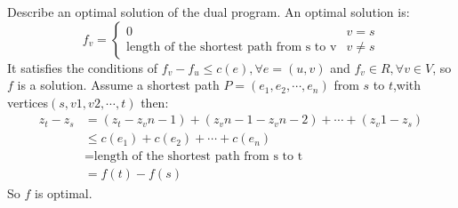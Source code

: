 \documentclass[11pt,a4paper,oneside]{article}
\begin{document}
\begin{problem}{5}
	\statement
  Describe an optimal solution of the dual program.
    \solution
	An optimal solution is:
	\begin{equation}
	f_v=
	\begin{cases}
	0& v=s\\
	\text{length of the shortest path from s to v}&v\neq s
	\end{cases}
	\end{equation}
	It satisfies the conditions of $f_v-f_u\leq c(e),\forall e=(u,v)$ and $f_v\in R,\forall v\in V$, so $f$ is a solution.
	Assume a shortest path $P=(e_1,e_2,\cdots,e_n)$ from $s$ to $t$,with vertices$(s,v1,v2,\cdots,t)$ then:
	$$
	\begin {align*}
	z_t-z_s&=(z_t-z_vn-1)+(z_vn-1-z_vn-2)+\cdots+(z_v1-z_s)\\
	&\leq c(e_1)+c(e_2)+\cdots+c(e_n)\\
	&=\text{length of the shortest path from s to t}\\
	&= f(t)-f(s)
	\end {align*}
	$$
	So $f$ is optimal.
\end{problem}
\end{document}

